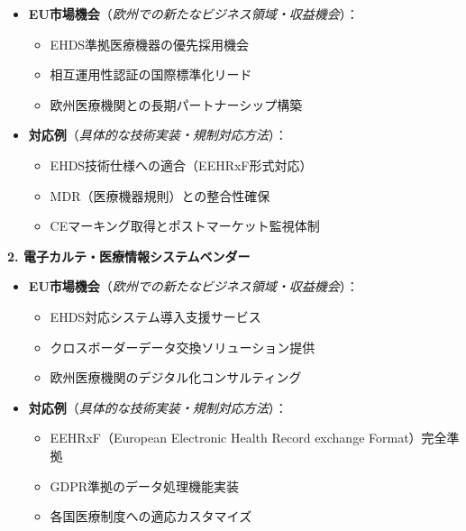 \documentclass[
  a4paper,
  a4paper,
  11pt]{ltjsbook}
\providecommand{\tightlist}{%
  \setlength{\itemsep}{0pt}\setlength{\parskip}{0pt}}
\begin{document}
\begin{itemize}
\tightlist
\item
  \textbf{EU市場機会}（\emph{欧州での新たなビジネス領域・収益機会}）：

  \begin{itemize}
  \tightlist
  \item
    EHDS準拠医療機器の優先採用機会
  \item
    相互運用性認証の国際標準化リード
  \item
    欧州医療機関との長期パートナーシップ構築
  \end{itemize}
\item
  \textbf{対応例}（\emph{具体的な技術実装・規制対応方法}）：

  \begin{itemize}
  \tightlist
  \item
    EHDS技術仕様への適合（EEHRxF形式対応）
  \item
    MDR（医療機器規則）との整合性確保
  \item
    CEマーキング取得とポストマーケット監視体制
  \end{itemize}
\end{itemize}

\textbf{2. 電子カルテ・医療情報システムベンダー}

\begin{itemize}
\tightlist
\item
  \textbf{EU市場機会}（\emph{欧州での新たなビジネス領域・収益機会}）：

  \begin{itemize}
  \tightlist
  \item
    EHDS対応システム導入支援サービス
  \item
    クロスボーダーデータ交換ソリューション提供
  \item
    欧州医療機関のデジタル化コンサルティング
  \end{itemize}
\item
  \textbf{対応例}（\emph{具体的な技術実装・規制対応方法}）：

  \begin{itemize}
  \tightlist
  \item
    EEHRxF（European Electronic Health Record exchange Format）完全準拠
  \item
    GDPR準拠のデータ処理機能実装
  \item
    各国医療制度への適応カスタマイズ
  \end{itemize}
\end{itemize}
\end{document}
